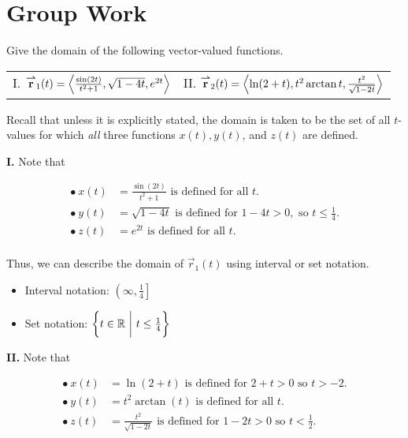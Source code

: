 \documentclass[noauthor, handout]{ximera}
\begin{document}

\section{Group Work}

\begin{problem}
Give the domain of the following vector-valued functions.

\begin{tabular}{ll}
I. ${\overset{\boldsymbol{\rightharpoonup}}{\mathbf{r}}}_1(t) = \left\langle \frac{\sin(2t)}{t^2+1},\sqrt{1-4t},e^{2t}\right\rangle$ & II. ${\overset{\boldsymbol{\rightharpoonup}}{\mathbf{r}}}_2(t) = \left\langle \ln(2+t),t^2 \arctan{t},\frac{t^2}{\sqrt{1-2t}}\right\rangle$
\end{tabular}

\begin{freeResponse}
Recall that unless it is explicitly stated, the domain is taken to be the set of all $t$-values for which \emph{all} three functions $x(t), y(t)$, and $z(t)$ are defined.

\textbf{I.} Note that

\begin{align*}
\bullet ~ x(t) &= \frac{\sin(2t)}{t^2+1} \textrm{ is defined for all } t .\\
\bullet ~ y(t) &= \sqrt{1-4t} \textrm{ is defined for } 1-4t > 0, \textrm{ so } t \leq \frac{1}{4}. \\
\bullet ~ z(t) &= e^{2t} \textrm{ is defined for all } t. \\
\end{align*}

Thus, we can describe the domain of $\vec{r}_1(t)$ using interval or set notation.

\begin{itemize}
\item Interval notation: $\left(\infty, \frac{1}{4} \right]$ 
\item Set notation: $\left\{ t \in \mathbb R ~ \bigg| ~ t \leq \frac{1}{4} \right\}$
\end{itemize}

\textbf{II.} Note that

\begin{align*}
\bullet ~ x(t) &= \ln(2+t) \textrm{ is defined for } 2+t > 0 \textrm{ so } t > -2. \\
\bullet ~ y(t) &= t^2\arctan(t) \textrm{ is defined for all } t. \\
\bullet ~ z(t) &= \frac{t^2}{\sqrt{1-2t}} \textrm{ is defined for } 1-2t>0 \textrm{ so } t < \frac{1}{2}. \\
\end{align*}


\end{freeResponse}
\end{problem}
\end{document}
